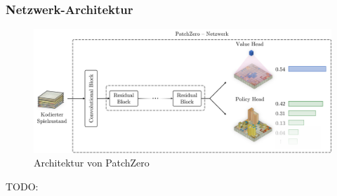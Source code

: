 \subsubsection*{Netzwerk-Architektur}

\begin{figure}[!ht]
    \centering
    \vspace*{-1.75cm}
    \includegraphics[width=\textwidth]{res/pictures/patch-zero-architecture.png}
    \caption{Architektur von PatchZero}
    \label{fig:patch-zero-architecture}
\end{figure}

TODO:

